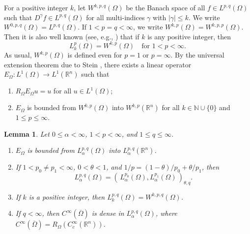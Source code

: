 \documentclass[reqno,centertags,11pt]{amsart}
\newtheorem{lem}[thm]{Lemma}
\theoremstyle{definition}
\numberwithin{thm}{section}
\numberwithin{equation}{section}
\newcommand{\N}{{\mathbb{N}}}
\newcommand{\R}{{\mathbb{R}}}
\begin{document}
For a positive integer $k$, let $W^{k,p,q}(\Omega )$ be the Banach space of   all $f \in L^{p,q}(\Omega )$ such that $D^\gamma f \in L^{p,q}(\Omega  )$ for all multi-indices $\gamma$ with $|\gamma | \le k$. We write $W^{0,p,q}(\Omega)= L^{p,q}(\Omega)$.
If $1< p=q <\infty$,  we write    $W^{k,p}(\Omega ) = W^{k,p,p}(\Omega )$.
Then it is also  well known (see, e.g., \cite[(2.2)]{JK}) that if $k$ is any positive integer, then
\begin{equation}\label{L equals W}
L_k^p (\Omega )= W^{k,p}(\Omega )\quad\mbox{for}\,\,1 <p <\infty.
\end{equation}
As usual, $W^{k,p}(\Omega )$ is defined even for $p=1$ or $p=\infty$. By the universal extension theorem due to Stein \cite[Chapter VI]{stein}, there exists a   linear    operator $E_\Omega : L^{1}(\Omega ) \to L^{1}(\R^n )$ such that
\begin{enumerate}
\item[\textup{(1)}] $R_\Omega E_\Omega u = u$ for all $u\in L^{1}(\Omega)$;
\item[\textup{(2)}] $E_\Omega$ is bounded from $W^{k,p}(\Omega )$ into $W^{k,p}(\R^n )$ for all $k\in \N\cup \{0\}$ and $1 \le p \le \infty$.
\end{enumerate}


\begin{lem}\label{interp for SL on domains} Let $0 \le   \alpha  <\infty$, $1< p <\infty$, and $ 1\le q  \le \infty$.
\begin{enumerate}[{\upshape (i)}]
\item $E_\Omega$ is bounded from $L_\alpha^{p,q}(\Omega )$ into $L_\alpha^{p,q}(\R^n )$.
\item  If      $1< p_0 \neq p_1 < \infty$, $0<\theta < 1$, and $1/p=(1-\theta)/p_0 +\theta/p_1$,    then
    $$
    L_\alpha^{p,q}(\Omega ) = \left(\,  L_\alpha^{p_0}(\Omega ) , L_\alpha^{p_1}(\Omega ) \, \right)_{\theta,q}   .
    $$
\item     If $k$ is a positive integer, then $L_k^{p,q}(\Omega ) =W^{k,p,q}(\Omega )$.
\item  If   $q<\infty$, then  $C^\infty (\overline{\Omega}) $ is dense in $L_\alpha^{p,q}(\Omega )$, where $C^\infty (\overline{\Omega}) =R_\Omega \left(C_c^\infty (\R^n ) \right)$.
\end{enumerate}
\end{lem}
\end{document}
